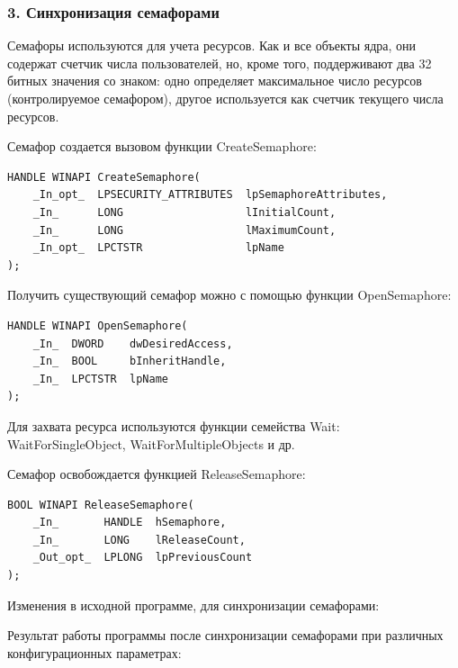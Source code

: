 \documentclass[14pt,a4paper,report]{report}
\begin{document}
\subsubsection{3. Синхронизация семафорами}

Семафоры используются для учета ресурсов. Как и все объекты ядра, они содержат счетчик числа пользователей, но, кроме того, поддерживают два 32 битных значения со знаком: одно определяет максимальное число ресурсов (контролируемое семафором), другое используется как счетчик текущего числа ресурсов.

Семафор создается вызовом функции CreateSemaphore:

\begin{verbatim}
HANDLE WINAPI CreateSemaphore(
    _In_opt_  LPSECURITY_ATTRIBUTES  lpSemaphoreAttributes,
    _In_      LONG                   lInitialCount,
    _In_      LONG                   lMaximumCount,
    _In_opt_  LPCTSTR                lpName
);
\end{verbatim} 

Получить существующий семафор можно с помощью функции OpenSemaphore:

\begin{verbatim}
HANDLE WINAPI OpenSemaphore(
    _In_  DWORD    dwDesiredAccess,
    _In_  BOOL     bInheritHandle,
    _In_  LPCTSTR  lpName
);
\end{verbatim} 

Для захвата ресурса используются функции семейства Wait: WaitForSingleObject, WaitForMultipleObjects и др.

Семафор освобождается функцией ReleaseSemaphore:

\begin{verbatim}
BOOL WINAPI ReleaseSemaphore(
    _In_       HANDLE  hSemaphore,
    _In_       LONG    lReleaseCount,
    _Out_opt_  LPLONG  lpPreviousCount
);
\end{verbatim} 

Изменения в исходной программе, для синхронизации семафорами:



\clearpage

Результат работы программы после синхронизации семафорами при различных конфигурационных параметрах:
\end{document}
